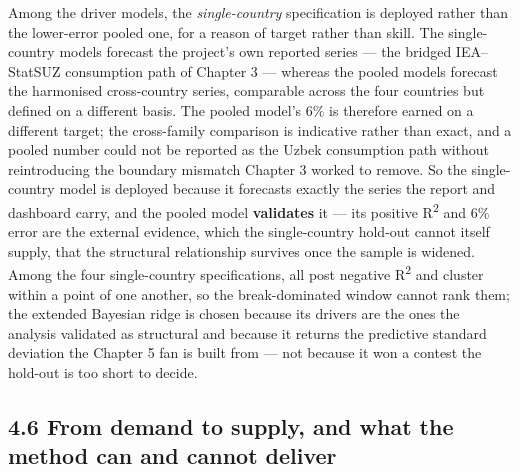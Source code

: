 \documentclass[10pt,twocolumn]{article}
\begin{document}
Among the driver models, the \textit{single-country} specification is deployed rather than the lower-error pooled one, for a reason of target rather than skill. The single-country models forecast the project's own reported series --- the bridged IEA--StatSUZ consumption path of Chapter 3 --- whereas the pooled models forecast the harmonised cross-country series, comparable across the four countries but defined on a different basis. The pooled model's 6\% is therefore earned on a different target; the cross-family comparison is indicative rather than exact, and a pooled number could not be reported as the Uzbek consumption path without reintroducing the boundary mismatch Chapter 3 worked to remove. So the single-country model is deployed because it forecasts exactly the series the report and dashboard carry, and the pooled model \textbf{validates} it --- its positive R\textsuperscript{2} and 6\% error are the external evidence, which the single-country hold-out cannot itself supply, that the structural relationship survives once the sample is widened. Among the four single-country specifications, all post negative R\textsuperscript{2} and cluster within a point of one another, so the break-dominated window cannot rank them; the extended Bayesian ridge is chosen because its drivers are the ones the analysis validated as structural and because it returns the predictive standard deviation the Chapter 5 fan is built from --- not because it won a contest the hold-out is too short to decide.

\subsection*{4.6 From demand to supply, and what the method can and cannot deliver}
\end{document}

